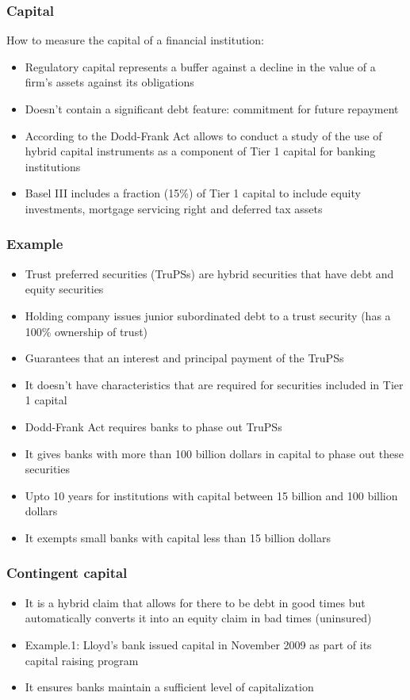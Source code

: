 \documentclass[11pt]{beamer}
\begin{document}
\begin{frame}
\frametitle{Capital}\itemsep10pt
How to measure the capital of a financial institution:
\begin{itemize}
\item Regulatory capital represents a buffer against a decline in the value of a firm's assets against its obligations
\item Doesn't contain a significant debt feature: commitment for future repayment
\item According to the Dodd-Frank Act allows to conduct a study of the use of hybrid capital instruments as a component of Tier 1 capital for banking institutions
\item Basel III includes a fraction (15\%) of Tier 1 capital to include equity investments, mortgage servicing right and deferred tax assets
\end{itemize}
\end{frame}

\begin{frame}
\frametitle{Example}
\begin{itemize}\itemsep10pt
\item Trust preferred securities (TruPSs) are hybrid securities that have debt and equity securities
\item Holding company issues junior subordinated debt to a trust security (has a 100\% ownership of trust)
\item Guarantees that an interest and principal payment of the TruPSs
\item It doesn't have characteristics that are required for securities included in Tier 1 capital
\item Dodd-Frank Act requires banks to phase out TruPSs
\item It gives banks with more than 100 billion dollars in capital to phase out these securities
\item Upto 10 years for institutions with capital between 15 billion and 100 billion dollars
\item It exempts small banks with capital less than 15 billion dollars
\end{itemize}
\end{frame}

\begin{frame}
\frametitle{Contingent capital}
\begin{itemize}
\item It is a hybrid claim that allows for there to be debt in good times but automatically converts it into an equity claim in bad times (uninsured)
\item Example.1: Lloyd's bank issued capital in November 2009 as part of its capital raising program
\item It ensures banks maintain a sufficient level of capitalization
\end{itemize}
\end{frame}
\end{document}
